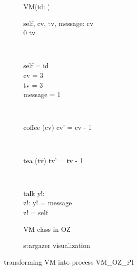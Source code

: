 \begin{figure}[H]
\begin{subfigure}{.6\textwidth}
\centering
\begin{class}{VM(id: \integer)}
\\
\begin{state}
self, cv, tv, message: \integer
{} \leq  cv 
\\
0 \leq  tv 
\end{state} 
\\
\begin{init}
self = id
\\cv = 3
\\tv = 3
\\message = 1
\end{init} 
\\
\begin{op}{coffee}
\Delta (cv)
\ST
cv' = cv - 1
\end{op}
\\
\begin{op}{tea}
\Delta (tv)
\ST
tv' = tv - 1
\end{op}
\\
\begin{op}{talk}
y!: \integer
\\z!: \integer
\ST
y! = message
\\z! = self
\end{op}
\end{class}
  \caption{VM class in OZ}
\end{subfigure}%
\begin{subfigure}{.4\textwidth}
  \centering
{}
  \caption{stargazer visualization}
\end{subfigure}
\caption{transforming VM into \picalc{} process VM\_OZ\_PI}
\label{tra_vm_OZ}
\end{figure}

